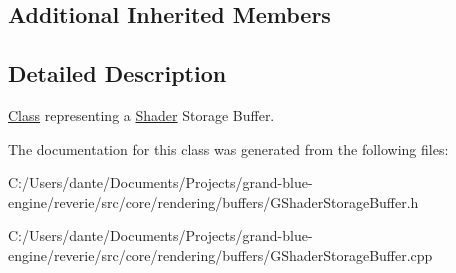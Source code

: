 \subsection*{Additional Inherited Members}


\subsection{Detailed Description}
\mbox{\hyperlink{struct_class}{Class}} representing a \mbox{\hyperlink{classrev_1_1_shader}{Shader}} Storage Buffer. 

The documentation for this class was generated from the following files\+:\begin{DoxyCompactItemize}
\item 
C\+:/\+Users/dante/\+Documents/\+Projects/grand-\/blue-\/engine/reverie/src/core/rendering/buffers/G\+Shader\+Storage\+Buffer.\+h\item 
C\+:/\+Users/dante/\+Documents/\+Projects/grand-\/blue-\/engine/reverie/src/core/rendering/buffers/G\+Shader\+Storage\+Buffer.\+cpp\end{DoxyCompactItemize}
